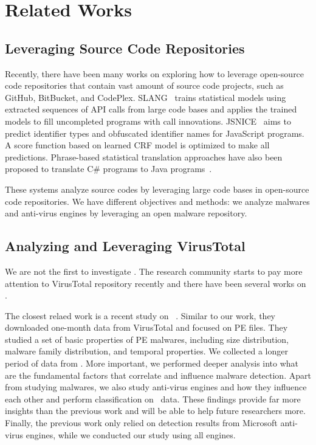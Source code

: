 \section{Related Works}
\label{sec:related}

\subsection{Leveraging Source Code Repositories}

Recently, there have been many works on exploring how to leverage open-source code repositories that contain vast amount of source code projects, 
such as GitHub, BitBucket, and CodePlex. 
SLANG~\cite{code-completion} trains statistical models using extracted sequences of API calls from large code bases
and applies the trained models to fill uncompleted programs with call innovations. 
JSNICE~\cite{big-predicting} aims to predict identifier types and obfuscated identifier names for JavaScript programs. 
A score function based on learned CRF model is optimized to make all predictions. 
Phrase-based statistical translation approaches have also been proposed
to translate C\# programs to Java programs~\cite{big-translation}. 

These systems analyze source codes by leveraging large code bases in open-source code repositories.
We have different objectives and methods: 
we analyze malwares and anti-virus engines by leveraging an open malware repository.


\subsection{Analyzing and Leveraging VirusTotal}
We are not the first to investigate \vt.
The research community starts to pay more attention to VirusTotal repository recently
and there have been several works on \vt.

The closest relaed work is a recent study on \vt{}~\cite{SongAPsys2016}. 
Similar to our work, they downloaded one-month data from VirusTotal
and focused on PE files.
They studied a set of basic properties of PE malwares,
including size distribution, malware family distribution, and temporal properties.   
We collected a longer period of data from \vt.
More important, we performed deeper analysis into what are the fundamental factors 
that correlate and influence malware detection.
Apart from studying malwares, we also study anti-virus engines and how they influence each other
and perform classification on \vt\ data.
These findings provide far more insights than the previous work and will be able to help future researchers more.
Finally, the previous work only relied on detection results from Microsoft anti-virus engines,
while we conducted our study using all engines.

